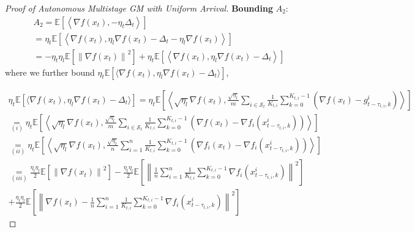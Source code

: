 \begin{proof}[Proof of Autonomous Multistage GM with Uniform Arrival]
\textbf{Bounding} $A_2$:
\begin{equation}
\begin{gathered}
A_2=\mathbb{E}\left[\left\langle \nabla f(x_t),-\eta_t \Delta_t \right\rangle\right]\\
=\eta_t\mathbb{E}\left[\left\langle \nabla f\left(x_t\right),\eta_l  \nabla f\left(x_t\right) - \Delta_t - \eta_l  \nabla f\left(x_t\right)  \right\rangle\right]\\
=-\eta_t \eta_l   \mathbb{E}\left [\left\| \nabla f\left(x_t\right) \right\|^2\right]+\eta_t\mathbb{E}\left[\left\langle \nabla f\left(x_t\right), \eta_l   \nabla f\left(x_t\right) - \Delta_t \right\rangle\right]
\end{gathered}\nonumber
\end{equation}
where we further bound $\eta_t\mathbb{E}\left[\langle \nabla f\left(x_t\right), \eta_l   \nabla f\left(x_t\right) - \Delta_t \rangle\right]$,
 

\begin{equation}
\begin{gathered}
\eta_t\mathbb{E}\left[\langle \nabla f\left(x_t\right), \eta_l   \nabla f\left(x_t\right) - \Delta_t \rangle\right]
=\eta_t \mathbb{E}\left[\left\langle \sqrt{\eta_l} \nabla f(x_t),   \frac{\sqrt{\eta_l}}{m}\sum_{i\in\mathcal{S}_t} \frac{1}{K_{t,i}} \sum_{k=0}^{K_{t,i}-1}\left(\nabla f(x_t) -  g_{t-\tau_{t,i},k}^i\right) \right\rangle\right]\\
\underset{(i)}{=}\eta_t \mathbb{E}\left[\left\langle \sqrt{\eta_l} \nabla f(x_t),   \frac{\sqrt{\eta_l}}{m}\sum_{i\in\mathcal{S}_t} \frac{1}{K_{t,i}} \sum_{k=0}^{K_{t,i}-1}\left(\nabla f(x_t) -  \nabla f_i(x_{t-\tau_{t,i},k}^i)\right) \right\rangle\right]\\
\underset{(ii)}{=}\eta_t \mathbb{E}\left[\left\langle \sqrt{\eta_l} \nabla f(x_t),   \frac{\sqrt{\eta_l}}{n}\sum_{i=1}^n \frac{1}{K_{t,i}} \sum_{k=0}^{K_{t,i}-1}\left(\nabla f_i(x_t) -  \nabla f_i(x_{t-\tau_{t,i},k}^i)\right) \right\rangle\right]\\
\underset{(iii)}{=} \frac{\eta_t\eta_l}{2} \mathbb{E}\left[\left\| \nabla f(x_t) \right\|^2\right] - \frac{\eta_t\eta_l}{2} \mathbb{E}\left[\left\| \frac{1}{n}\sum_{i=1}^n \frac{1}{K_{t,i}} \sum_{k=0}^{K_{t,i}-1} \nabla f_i(x_{t-\tau_{t,i},k}^i) \right\|^2\right] \\
+ \frac{\eta_t\eta_l}{2} \mathbb{E}\left[\left\| \nabla f(x_t) - \frac{1}{n}\sum_{i=1}^n \frac{1}{K_{t,i}} \sum_{k=0}^{K_{t,i}-1}  \nabla f_i(x_{t-\tau_{t,i},k}^i) \right\|^2\right]
\end{gathered}\nonumber
\end{equation}


\end{proof}
